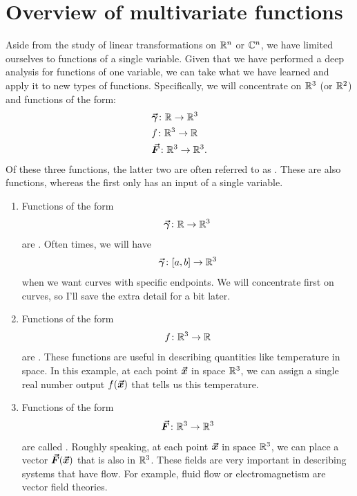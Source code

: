    
        \section{Overview of multivariate functions}
        Aside from the study of linear transformations on $\mathbb{R}^n$ or $\mathbb{C}^n$, we have limited ourselves to functions of a single variable.  Given that we have performed a deep analysis for functions of one variable, we can take what we have learned and apply it to new types of functions. Specifically, we will concentrate on $\mathbb{R}^3$ (or $\mathbb{R}^2$) and functions of the form:
        \begin{align*}
            &\boldsymbol{\vec{\gamma}}\colon \mathbb{R} \to \mathbb{R}^3\\
            &f\colon \mathbb{R}^3 \to \mathbb{R}\\
            &\boldsymbol{\vec{F}} \colon \mathbb{R}^3 \to \mathbb{R}^3.
        \end{align*}
        Of these three functions, the latter two are often referred to as .  These are also  functions, whereas the first only has an input of a single variable.
        
        
        \begin{enumerate}[(1)]
        \item Functions of the form
        \[
        \boldsymbol{\vec{\gamma}} \colon \mathbb{R}\to \mathbb{R}^3
        \]
        are .  Often times, we will have 
        \[
        \boldsymbol{\vec{\gamma}} \colon [a,b]\to \mathbb{R}^3
        \]
        when we want curves with specific endpoints. We will concentrate first on curves, so I'll save the extra detail for a bit later.
        
        \item Functions of the form
        \[
        f\colon \mathbb{R}^3 \to \mathbb{R}
        \]
        are  .   These functions are useful in describing quantities like temperature in space.  In this example, at each point $\boldsymbol{\boldsymbol{\vec{x}}}$ in space $\mathbb{R}^3$, we can assign a single real number output $f(\boldsymbol{\boldsymbol{\vec{x}}})$ that tells us this temperature.  
        
        
        \item Functions of the form
        \[
        \boldsymbol{\vec{F}}\colon \mathbb{R}^3 \to \mathbb{R}^3
        \]
        are called .  Roughly speaking, at each point $\boldsymbol{\boldsymbol{\vec{x}}}$ in space $\mathbb{R}^3$, we can place a vector $\boldsymbol{\vec{F}}(\boldsymbol{\boldsymbol{\vec{x}}})$ that is also in $\mathbb{R}^3$.  These fields are very important in describing systems that have flow.  For example, fluid flow or electromagnetism are vector field theories. 
        
        \end{enumerate}
        
